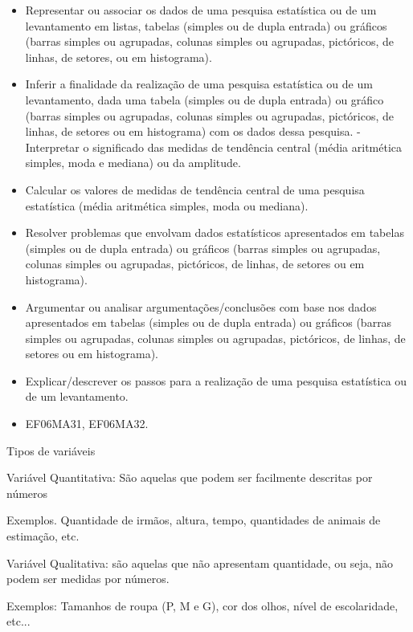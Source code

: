 \begin{itemize}
\item
  Representar ou associar os dados de uma pesquisa estatística ou de um
  levantamento em listas, tabelas (simples ou de dupla entrada) ou
  gráficos (barras simples ou agrupadas, colunas simples ou agrupadas,
  pictóricos, de linhas, de setores, ou em histograma).
\item
  Inferir a finalidade da realização de uma pesquisa estatística ou de
  um levantamento, dada uma tabela (simples ou de dupla entrada) ou
  gráfico (barras simples ou agrupadas, colunas simples ou agrupadas,
  pictóricos, de linhas, de setores ou em histograma) com os dados dessa
  pesquisa. - Interpretar o significado das medidas de tendência central
  (média aritmética simples, moda e mediana) ou da amplitude.
\item
  Calcular os valores de medidas de tendência central de uma pesquisa
  estatística (média aritmética simples, moda ou mediana).
\item
  Resolver problemas que envolvam dados estatísticos apresentados em
  tabelas (simples ou de dupla entrada) ou gráficos (barras simples ou
  agrupadas, colunas simples ou agrupadas, pictóricos, de linhas, de
  setores ou em histograma).
\item
  Argumentar ou analisar argumentações/conclusões com base nos dados
  apresentados em tabelas (simples ou de dupla entrada) ou gráficos
  (barras simples ou agrupadas, colunas simples ou agrupadas,
  pictóricos, de linhas, de setores ou em histograma).
\item
  Explicar/descrever os passos para a realização de uma pesquisa
  estatística ou de um levantamento.
\end{itemize}


\begin{itemize} 
\item  EF06MA31, EF06MA32.
\end{itemize}

Tipos de variáveis

Variável Quantitativa: São aquelas que podem ser facilmente descritas
por números

Exemplos. Quantidade de irmãos, altura, tempo, quantidades de animais de
estimação, etc.

Variável Qualitativa: são aquelas que não apresentam quantidade, ou
seja, não podem ser medidas por números.

Exemplos: Tamanhos de roupa (P, M e G), cor dos olhos, nível de
escolaridade, etc...

